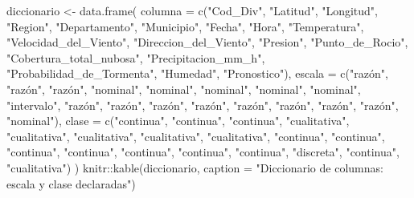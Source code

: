 \documentclass[oneside, openany, fontset=libertinus]{mitthesis}
\newenvironment{Shaded}{\begin{snugshade}}{\end{snugshade}}
\newcommand{\AttributeTok}[1]{\textcolor[rgb]{0.40,0.45,0.13}{#1}}
\newcommand{\FunctionTok}[1]{\textcolor[rgb]{0.28,0.35,0.67}{#1}}
\newcommand{\NormalTok}[1]{\textcolor[rgb]{0.00,0.23,0.31}{#1}}
\newcommand{\OtherTok}[1]{\textcolor[rgb]{0.00,0.23,0.31}{#1}}
\newcommand{\SpecialCharTok}[1]{\textcolor[rgb]{0.37,0.37,0.37}{#1}}
\newcommand{\StringTok}[1]{\textcolor[rgb]{0.13,0.47,0.30}{#1}}
\begin{document}
\begin{Shaded}
\begin{Highlighting}[]
\NormalTok{diccionario }\OtherTok{\textless{}{-}} \FunctionTok{data.frame}\NormalTok{(}
  \AttributeTok{columna =} \FunctionTok{c}\NormalTok{(}\StringTok{"Cod\_Div"}\NormalTok{, }\StringTok{"Latitud"}\NormalTok{, }\StringTok{"Longitud"}\NormalTok{, }\StringTok{"Region"}\NormalTok{, }\StringTok{"Departamento"}\NormalTok{,}
              \StringTok{"Municipio"}\NormalTok{, }\StringTok{"Fecha"}\NormalTok{, }\StringTok{"Hora"}\NormalTok{, }\StringTok{"Temperatura"}\NormalTok{,}
              \StringTok{"Velocidad\_del\_Viento"}\NormalTok{, }\StringTok{"Direccion\_del\_Viento"}\NormalTok{, }\StringTok{"Presion"}\NormalTok{,}
              \StringTok{"Punto\_de\_Rocio"}\NormalTok{, }\StringTok{"Cobertura\_total\_nubosa"}\NormalTok{,}
              \StringTok{"Precipitacion\_mm\_h"}\NormalTok{, }\StringTok{"Probabilidad\_de\_Tormenta"}\NormalTok{, }\StringTok{"Humedad"}\NormalTok{,}
              \StringTok{"Pronostico"}\NormalTok{),}
  \AttributeTok{escala =} \FunctionTok{c}\NormalTok{(}\StringTok{"razón"}\NormalTok{, }\StringTok{"razón"}\NormalTok{, }\StringTok{"razón"}\NormalTok{, }\StringTok{"nominal"}\NormalTok{, }\StringTok{"nominal"}\NormalTok{, }\StringTok{"nominal"}\NormalTok{,}
             \StringTok{"nominal"}\NormalTok{, }\StringTok{"nominal"}\NormalTok{, }\StringTok{"intervalo"}\NormalTok{, }\StringTok{"razón"}\NormalTok{, }\StringTok{"razón"}\NormalTok{, }\StringTok{"razón"}\NormalTok{,}
             \StringTok{"razón"}\NormalTok{, }\StringTok{"razón"}\NormalTok{, }\StringTok{"razón"}\NormalTok{, }\StringTok{"razón"}\NormalTok{, }\StringTok{"razón"}\NormalTok{, }\StringTok{"nominal"}\NormalTok{),}
  \AttributeTok{clase =} \FunctionTok{c}\NormalTok{(}\StringTok{"continua"}\NormalTok{, }\StringTok{"continua"}\NormalTok{, }\StringTok{"continua"}\NormalTok{, }\StringTok{"cualitativa"}\NormalTok{, }\StringTok{"cualitativa"}\NormalTok{,}
            \StringTok{"cualitativa"}\NormalTok{, }\StringTok{"cualitativa"}\NormalTok{, }\StringTok{"cualitativa"}\NormalTok{, }\StringTok{"continua"}\NormalTok{,}
            \StringTok{"continua"}\NormalTok{, }\StringTok{"continua"}\NormalTok{, }\StringTok{"continua"}\NormalTok{, }\StringTok{"continua"}\NormalTok{, }\StringTok{"continua"}\NormalTok{,}
            \StringTok{"continua"}\NormalTok{, }\StringTok{"discreta"}\NormalTok{, }\StringTok{"continua"}\NormalTok{, }\StringTok{"cualitativa"}\NormalTok{)}
\NormalTok{)}
\NormalTok{knitr}\SpecialCharTok{::}\FunctionTok{kable}\NormalTok{(diccionario,}
             \AttributeTok{caption =} \StringTok{"Diccionario de columnas: escala y clase declaradas"}\NormalTok{)}
\end{Highlighting}
\end{Shaded}
\end{document}
